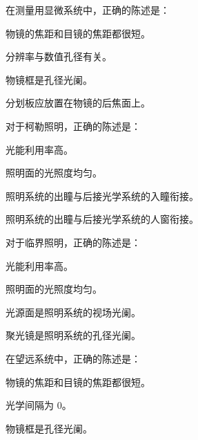\documentclass[standard, analysis, notocnum]{ExBook}
\newcommand{\answerarea}[1][8cm]{%
  \par\vspace{2mm}%
  \noindent{\color{themeColor!35}\rule{\linewidth}{0.4pt}}\par
  \noindent\begin{minipage}[t][#1][t]{\linewidth}\vspace{0pt}\end{minipage}\par
  \noindent{\color{themeColor!35}\rule{\linewidth}{0.4pt}}\par
}
\begin{document}
\begin{qitems}
\begin{bbox}
\qitem 在测量用显微系统中，正确的陈述是：
\par\noindent\hspace{2em}物镜的焦距和目镜的焦距都很短。
\par\noindent\hspace{2em}分辨率与数值孔径有关。
\par\noindent\hspace{2em}物镜框是孔径光阑。
\par\noindent\hspace{2em}分划板应放置在物镜的后焦面上。
\answerarea[3.5cm]
\end{bbox}
\begin{bbox}
\qitem 对于柯勒照明，正确的陈述是：
\par\noindent\hspace{2em}光能利用率高。
\par\noindent\hspace{2em}照明面的光照度均匀。
\par\noindent\hspace{2em}照明系统的出瞳与后接光学系统的入瞳衔接。
\par\noindent\hspace{2em}照明系统的出瞳与后接光学系统的人窗衔接。
\answerarea[3.5cm]
\end{bbox}
\begin{bbox}
\qitem 对于临界照明，正确的陈述是：
\par\noindent\hspace{2em}光能利用率高。
\par\noindent\hspace{2em}照明面的光照度均匀。
\par\noindent\hspace{2em}光源面是照明系统的视场光阑。
\par\noindent\hspace{2em}聚光镜是照明系统的孔径光阑。
\answerarea[3.5cm]
\end{bbox}
\begin{bbox}
\qitem 在望远系统中，正确的陈述是：
\par\noindent\hspace{2em}物镜的焦距和目镜的焦距都很短。
\par\noindent\hspace{2em}光学间隔为 0。
\par\noindent\hspace{2em}物镜框是孔径光阑。

\end{bbox}
\end{qitems}
\end{document}
